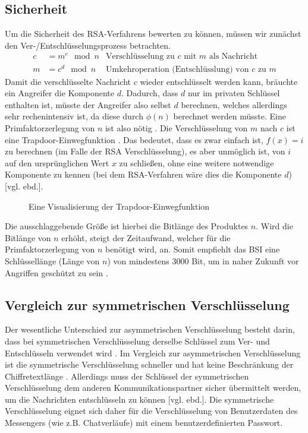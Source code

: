 \documentclass[a4paper,ngerman, headheight=28pt,12pt]{scrartcl}
\newcommand{\vcite}[1]{\cite[vgl.][]{#1}}
\newcommand{\vebd}{[vgl. ebd.]}
\begin{document}
\subsection{Sicherheit}
Um die Sicherheit des RSA-Verfahrens bewerten zu können, müssen wir zunächst den Ver-/Entschlüsselungsprozess betrachten.
\begin{equation*}
  \begin{aligned}
    c & = m^e \mod n & \text{Verschlüsselung zu $c$ mit $m$ als Nachricht}    \\
    m & = c^d \mod n & \text{Umkehroperation (Entschlüsslung) von $c$ zu $m$}
  \end{aligned}
\end{equation*}
Damit die verschlüsselte Nachricht $c$ wieder entschlüsselt werden kann, bräuchte ein Angreifer die Komponente $d$. Dadurch, dass $d$ nur im privaten Schlüssel enthalten ist, müsste der Angreifer also selbst $d$ berechnen, welches allerdings sehr rechenintensiv ist, da diese durch $\phi(n)$ berechnet werden müsste. Eine Primfaktorzerlegung von $n$ ist also nötig \vcite{EulersTotientFunction}. Die Verschlüsselung von $m$ nach $c$ ist eine Trapdoor-Einwegfunktion \vcite{RsaTrapdoor}. Das bedeutet, dass es zwar einfach ist, $f(x) = i$ zu berechnen (im Falle der RSA Verschlüsselung), es aber unmöglich ist, von $i$ auf den ursprünglichen Wert $x$ zu schließen, ohne eine weitere notwendige Komponente zu kennen (bei dem RSA-Verfahren wäre dies die Komponente $d$) \vebd.
\begin{figure}[ht]
  \centering
  
  \caption{Eine Visualisierung der Trapdoor-Einwegfunktion \vcite{fig:TrapdoorPermutation} \label{fig:TrapdoorFunc}}
\end{figure}
Die ausschlaggebende Größe ist hierbei die Bitlänge des Produktes $n$. Wird die Bitlänge von $n$ erhöht, steigt der Zeitaufwand, welcher für die Primfaktorzerlegung von $n$ benötigt wird, an. Somit empfiehlt das BSI eine Schlüssellänge (Länge von $n$) von mindestens 3000 Bit, um in naher Zukunft vor Angriffen geschützt zu sein \vcite{RsaKeyLength}.
\subsection{Vergleich zur symmetrischen Verschlüsselung}
Der wesentliche Unterschied zur asymmetrischen Verschlüsselung besteht darin, dass bei symmetrischen Verschlüsselung derselbe Schlüssel zum Ver- und Entschlüsseln verwendet wird \vcite{GeneralSymmetricCryptography}. Im Vergleich zur asymmetrischen Verschlüsselung ist die symmetrische Verschlüsselung schneller und hat keine Beschränkung der Chiffretextlänge \vcite{RsaAESAnalysis, OpensslRsaMaxLength}. Allerdings muss der Schlüssel der symmetrischen Verschlüsselung dem anderen Kommunikationspartner sicher übermittelt werden, um die Nachrichten entschlüsseln zu können \vebd.
Die symmetrische Verschlüsselung eignet sich daher für die Verschlüsselung von Benutzerdaten des Messengers (wie z.B. Chatverläufe) mit einem benutzerdefinierten Passwort.
\end{document}

